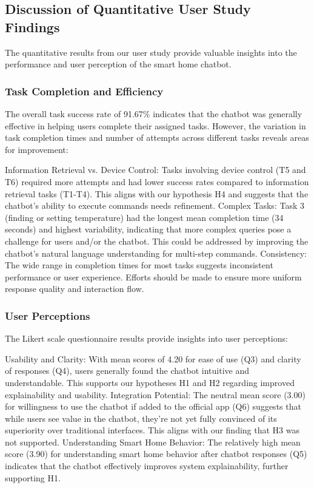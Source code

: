 \subsection{Discussion of Quantitative User Study Findings}
The quantitative results from our user study provide valuable insights into the performance and user perception of the smart home chatbot.
\subsubsection{Task Completion and Efficiency}
The overall task success rate of 91.67\% indicates that the chatbot was generally effective in helping users complete their assigned tasks. However, the variation in task completion times and number of attempts across different tasks reveals areas for improvement:

Information Retrieval vs. Device Control: Tasks involving device control (T5 and T6) required more attempts and had lower success rates compared to information retrieval tasks (T1-T4). This aligns with our hypothesis H4 and suggests that the chatbot's ability to execute commands needs refinement.
Complex Tasks: Task 3 (finding or setting temperature) had the longest mean completion time (34 seconds) and highest variability, indicating that more complex queries pose a challenge for users and/or the chatbot. This could be addressed by improving the chatbot's natural language understanding for multi-step commands.
Consistency: The wide range in completion times for most tasks suggests inconsistent performance or user experience. Efforts should be made to ensure more uniform response quality and interaction flow.

\subsubsection{User Perceptions}
The Likert scale questionnaire results provide insights into user perceptions:

Usability and Clarity: With mean scores of 4.20 for ease of use (Q3) and clarity of responses (Q4), users generally found the chatbot intuitive and understandable. This supports our hypotheses H1 and H2 regarding improved explainability and usability.
Integration Potential: The neutral mean score (3.00) for willingness to use the chatbot if added to the official app (Q6) suggests that while users see value in the chatbot, they're not yet fully convinced of its superiority over traditional interfaces. This aligns with our finding that H3 was not supported.
Understanding Smart Home Behavior: The relatively high mean score (3.90) for understanding smart home behavior after chatbot responses (Q5) indicates that the chatbot effectively improves system explainability, further supporting H1.

